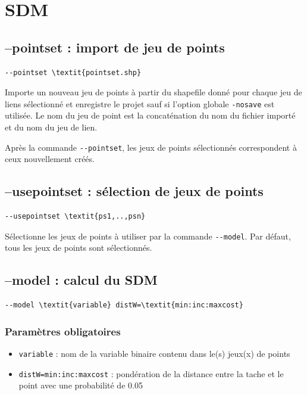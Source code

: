 \documentclass[a4paper,10pt]{report}
\begin{document}
\section{SDM}
\subsection{--pointset : import de jeu de points}
\begin{Verbatim}[commandchars=\\\{\}]
--pointset \textit{pointset.shp}
\end{Verbatim}
Importe un nouveau jeu de points à partir du shapefile donné pour chaque jeu de liens sélectionné et enregistre le projet sauf si l'option globale \verb|-nosave| est utilisée.
Le nom du jeu de point est la concaténation du nom du fichier importé et du nom du jeu de lien.

Après la commande \verb|--pointset|, les jeux de points sélectionnés correspondent à ceux nouvellement créés.

\subsection{--usepointset : sélection de jeux de points}
\begin{Verbatim}[commandchars=\\\{\}]
--usepointset \textit{ps1,..,psn}
\end{Verbatim}
Sélectionne les jeux de points à utiliser par la commande \verb|--model|.
Par défaut, tous les jeux de points sont sélectionnés.

\subsection{--model : calcul du SDM}
\begin{Verbatim}[commandchars=\\\{\}]
--model \textit{variable} distW=\textit{min:inc:maxcost}
\end{Verbatim}

\subsubsection{Paramètres obligatoires}
\begin{itemize}
	\item \verb|variable| : nom de la variable binaire contenu dans le(s) jeux(x) de points
	\item \verb|distW=min:inc:maxcost| : pondération de la distance entre la tache et le point avec une probabilité de 0.05	
\end{itemize}
\end{document}
